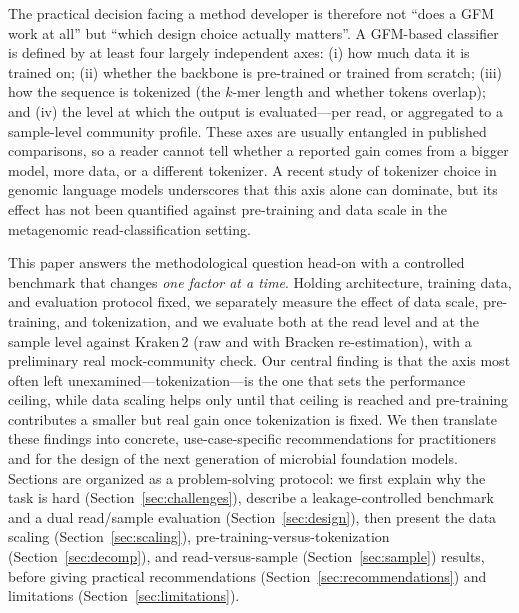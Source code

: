 The practical decision facing a method developer is therefore not ``does a
GFM work at all'' but ``which design choice actually matters''. A GFM-based
classifier is defined by at least four largely independent axes: (i) how much
data it is trained on; (ii) whether the backbone is pre-trained or trained
from scratch; (iii) how the sequence is tokenized (the $k$-mer length and
whether tokens overlap); and (iv) the level at which the output is
evaluated---per read, or aggregated to a sample-level community profile.
These axes are usually entangled in published comparisons, so a reader cannot
tell whether a reported gain comes from a bigger model, more data, or a
different tokenizer. A recent study of tokenizer choice in genomic language
models \citep{Lindsey2025tokenizer} underscores that this axis alone can
dominate, but its effect has not been quantified against pre-training and data
scale in the metagenomic read-classification setting.

This paper answers the methodological question head-on with a controlled
benchmark that changes \emph{one factor at a time}. Holding architecture,
training data, and evaluation protocol fixed, we separately measure the effect
of data scale, pre-training, and tokenization, and we evaluate both at the
read level and at the sample level against Kraken\,2 (raw and with Bracken
re-estimation), with a preliminary real mock-community check. Our central finding is
that the axis most often left unexamined---tokenization---is the one that sets
the performance ceiling, while data scaling helps only until that ceiling is
reached and pre-training contributes a smaller but real gain once tokenization
is fixed. We then translate these findings into concrete, use-case-specific
recommendations for practitioners and for the design of the next generation of
microbial foundation models. Sections are organized as a problem-solving
protocol: we first explain why the task is hard
(Section~\ref{sec:challenges}), describe a leakage-controlled benchmark and a
dual read/sample evaluation (Section~\ref{sec:design}), then present the data
scaling (Section~\ref{sec:scaling}), pre-training-versus-tokenization
(Section~\ref{sec:decomp}), and read-versus-sample (Section~\ref{sec:sample})
results, before giving practical recommendations
(Section~\ref{sec:recommendations}) and limitations
(Section~\ref{sec:limitations}).
